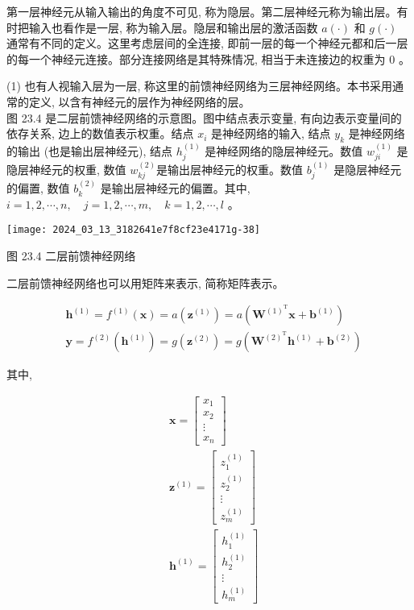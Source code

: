 \documentclass[10pt]{article}
\begin{document}
\begin{CJK*}{UTF8}{bsmi}
第一层神经元从输入输出的角度不可见, 称为隐层。第二层神经元称为输出层。有时把输入也看作是一层, 称为输入层。隐层和输出层的激活函数 $a(\cdot)$ 和 $g(\cdot)$ 通常有不同的定义。这里考虑层间的全连接, 即前一层的每一个神经元都和后一层的每一个神经元连接。部分连接网络是其特殊情况, 相当于未连接边的权重为 0 。

(1) 也有人视输入层为一层, 称这里的前馈神经网络为三层神经网络。本书采用通常的定义, 以含有神经元的层作为神经网络的层。\\
图 23.4 是二层前馈神经网络的示意图。图中结点表示变量, 有向边表示变量间的依存关系, 边上的数值表示权重。结点 $x_{i}$ 是神经网络的输入, 结点 $y_{k}$ 是神经网络的输出 (也是输出层神经元), 结点 $h_{j}^{(1)}$ 是神经网络的隐层神经元。数值 $w_{j i}^{(1)}$ 是隐层神经元的权重, 数值 $w_{k j}^{(2)}$是输出层神经元的权重。数值 $b_{j}^{(1)}$ 是隐层神经元的偏置, 数值 $b_{k}^{(2)}$ 是输出层神经元的偏置。其中, $i=1,2, \cdots, n, \quad j=1,2, \cdots, m, \quad k=1,2, \cdots, l$ 。

\begin{center}
\texttt{[image: 2024\_03\_13\_3182641e7f8cf23e4171g-38]}
\end{center}

图 23.4 二层前馈神经网络

二层前馈神经网络也可以用矩阵来表示, 简称矩阵表示。


\begin{align*}
& \boldsymbol{h}^{(1)}=f^{(1)}(\boldsymbol{x})=a\left(\boldsymbol{z}^{(1)}\right)=a\left(\boldsymbol{W}^{(1)^{\mathrm{T}}} \boldsymbol{x}+\boldsymbol{b}^{(1)}\right)  \tag{23.8}\\
& \boldsymbol{y}=f^{(2)}\left(\boldsymbol{h}^{(1)}\right)=g\left(\boldsymbol{z}^{(2)}\right)=g\left(\boldsymbol{W}^{(2)^{\mathrm{T}}} \boldsymbol{h}^{(1)}+\boldsymbol{b}^{(2)}\right) \tag{23.9}
\end{align*}


其中,

$$
\begin{aligned}
& \boldsymbol{x}=\left[\begin{array}{c}
x_{1} \\
x_{2} \\
\vdots \\
x_{n}
\end{array}\right] \\
& \boldsymbol{z}^{(1)}=\left[\begin{array}{c}
z_{1}^{(1)} \\
z_{2}^{(1)} \\
\vdots \\
z_{m}^{(1)}
\end{array}\right] \\
& \boldsymbol{h}^{(1)}=\left[\begin{array}{c}
h_{1}^{(1)} \\
h_{2}^{(1)} \\
\vdots \\
h_{m}^{(1)}
\end{array}\right]
\end{aligned}
$$


\end{CJK*}
\end{document}

